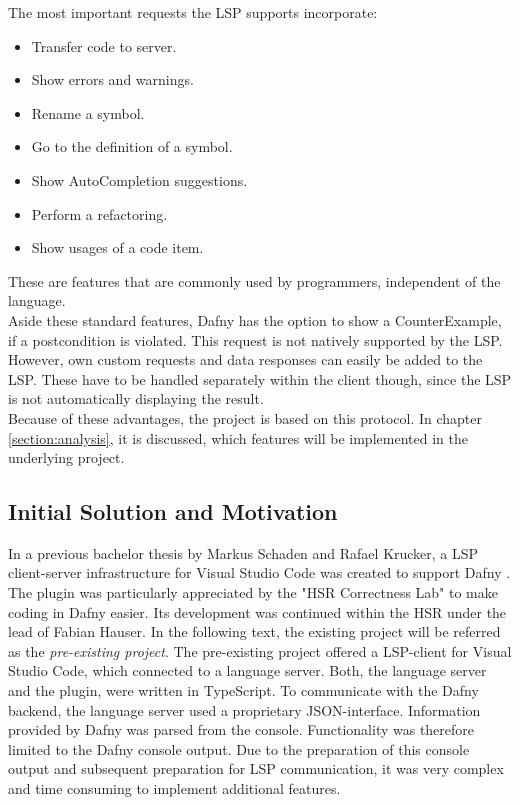 The most important requests the LSP supports incorporate:
\begin{itemize}
    \item Transfer code to server.
    \item Show errors and warnings.
    \item Rename a symbol.
    \item Go to the definition of a symbol.
    \item Show AutoCompletion suggestions.
    \item Perform a refactoring.
    \item Show usages of a code item.
\end{itemize}

These are features that are commonly used by programmers, independent of the language.\\

Aside these standard features, Dafny has the option to show a CounterExample, if a postcondition is violated.
This request is not natively supported by the LSP.
However, own custom requests and data responses can easily be added to the LSP.
These have to be handled separately within the client though, since the LSP is not automatically displaying the result. \\

Because of these advantages, the project is based on this protocol.
In chapter \ref{section:analysis}, it is discussed, which features will be implemented in the underlying project.

\subsection{Initial Solution and Motivation}
\label{section:introduction:initialsolution}
In a previous bachelor thesis by Markus Schaden and Rafael Krucker, a LSP client-server infrastructure for Visual Studio Code was created to support Dafny \cite{ba}.
The plugin was particularly appreciated by the "HSR Correctness Lab" \cite{correctnessLab} to make coding in Dafny easier.
Its development was continued within the HSR under the lead of Fabian Hauser.
In the following text, the existing project will be referred as the \textit{pre-existing project}. 
The pre-existing project offered a LSP-client for Visual Studio Code, which connected to a language server.
Both, the language server and the plugin, were written in TypeScript.
To communicate with the Dafny backend, the language server used a proprietary JSON-interface.
Information provided by Dafny was parsed from the console.
Functionality was therefore limited to the Dafny console output.
Due to the preparation of this console output and subsequent preparation for LSP communication,
it was very complex and time consuming to implement additional features. \\

